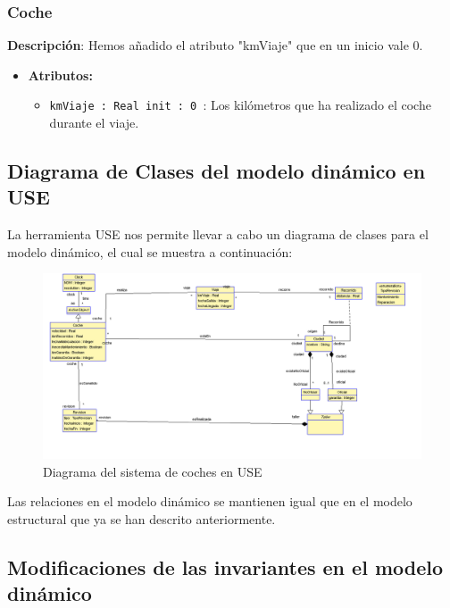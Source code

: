 \documentclass[12pt.a4paper]{article}
\begin{document}
\subsubsection{Coche}
\textbf{Descripción}:  Hemos añadido el atributo "kmViaje" que en un inicio vale 0.
\begin{itemize}
    \item \textbf{Atributos:}
    \begin{itemize}
        \item \texttt{kmViaje : Real init : 0 }: Los kilómetros que ha realizado el coche durante el viaje.
    \end{itemize}
\end{itemize}

\subsection{Diagrama de Clases del modelo dinámico en USE}
La herramienta USE nos permite llevar a cabo un diagrama de clases para el modelo dinámico, el cual se muestra a continuación:
\begin{figure}[H]
     \includegraphics[width=1\linewidth]{diagramas/USE_B.png}
     \caption{Diagrama del sistema de coches en USE}
     \label{Diagrama del sistema de coches en USE}
\end{figure}

Las relaciones en el modelo dinámico se mantienen igual que en el modelo estructural que ya se han descrito anteriormente.


\subsection{Modificaciones de las invariantes en el modelo dinámico}
\end{document}
